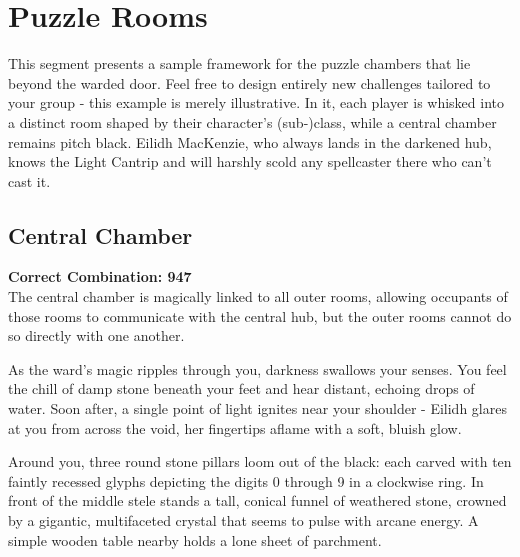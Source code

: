 \section*{Puzzle Rooms}
{\entryfont This segment presents a sample framework for the puzzle chambers that lie beyond the warded door. Feel free to design entirely new challenges tailored to your group - this example is merely illustrative. In it, each player is whisked into a distinct room shaped by their character's (sub-)class, while a central chamber remains pitch black. Eilidh MacKenzie, who always lands in the darkened hub, knows the Light Cantrip and will harshly scold any spellcaster there who can't cast it.}

\subsection*{Central Chamber}
\textbf{{\entryfont Correct Combination:} 947}\\
{\entryfont The central chamber is magically linked to all outer rooms, allowing occupants of those rooms to communicate with the central hub, but the outer rooms cannot do so directly with one another.}

\begin{DndReadAloud}
	As the ward's magic ripples through you, darkness swallows your senses. You feel the chill of damp stone beneath your feet and hear distant, echoing drops of water. Soon after, a single point of light ignites near your shoulder - Eilidh glares at you from across the void, her fingertips aflame with a soft, bluish glow.
	
	Around you, three round stone pillars loom out of the black: each carved with ten faintly recessed glyphs depicting the digits 0 through 9 in a clockwise ring. In front of the middle stele stands a tall, conical funnel of weathered stone, crowned by a gigantic, multifaceted crystal that seems to pulse with arcane energy. A simple wooden table nearby holds a lone sheet of parchment.
\end{DndReadAloud}

